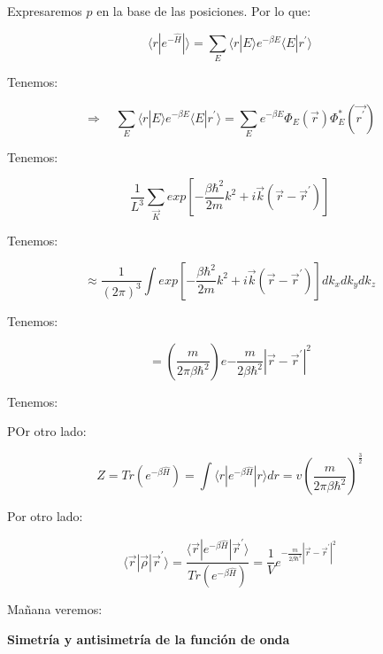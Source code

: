 \documentclass{article}
\begin{document}
Expresaremos $\hat{p}$ en la base de las posiciones. Por lo que:


\[ \langle r \left| e^{- \hat{H}} \right| \rangle = \sum\limits_{E} \langle r |E \rangle e^{-\beta E} \langle E | r^{\prime} \rangle \]

 Tenemos:
 
\[  \Rightarrow \quad \sum\limits_{E} \langle r |E   \rangle e^{-\beta E} \langle E | r^{\prime} \rangle = \sum\limits_{E} e^{-\beta E} \Phi_{E} (\vec{r}) \Phi_{E}^{\ast}(\vec{r^{\prime}}) \]


Tenemos:


\[  \frac{ 1}{L^{3}  } \sum\limits_{\vec{K}} exp \left[ - \frac{ \beta \hbar^{2} }{2m} k^{2} + i \vec{k} (\vec{r}-\vec{r}^{\prime})  \right]  \]


Tenemos:


\[ \approx \frac{ 1 }{ \left (  2\pi \right)^{3}  } \int\limits exp \left[ - \frac{ \beta \hbar^{2} }{2m} k^{2} + i \vec{k}(\vec{r}-\vec{r}^{\prime}) \right] dk_{x}dk_{y}dk_{z} \]


Tenemos:



\[ = \left(  \frac{m}{2\pi \beta \hbar^{2}}    \right) e{- \frac{m}{2\beta \hbar^{2}} \left| \vec{r}-\vec{r}^{\prime} \right|^{2} }  \]


Tenemos:


POr otro lado:




\[ Z = Tr(e^{-\beta\hat{H}}) = \int\limits \langle r | e^{-\beta \hat{H}} | r \rangle dr = v \left( \frac{m}{2\pi \beta \hbar^{2}}   \right)^{\frac{3}{2}} \]


Por otro lado:


\[ \langle \vec{r} | \vec{\rho}| \vec{r}^{\prime} \rangle   = \frac{   \langle \vec{r} | e^{-\beta \hat{H}} | \vec{r}^{\prime} \rangle }{Tr(e^{-\beta \hat{H}})}  =  \frac{1}{V} e^{- \frac{m}{2\beta\hbar^{2}}  | \vec{r} - \vec{r}^{\prime} |^{2} } \]


Mañana veremos:


\textbf{Simetría y antisimetría de la función de onda}
\end{document}
